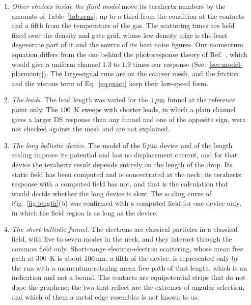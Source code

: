 \begin{enumerate}
under gates of $5$ and $10\nm$ at $0.3\THz$, which is where the largest
efficiencies of the grid are (Table~\ref{tab:ladders}). No large-signal
calculation here contains the viscoelastic term, and the low-density
points of the grid were not examined without it.
\item \emph{Other choices inside the fluid model} move its terahertz
numbers by the amounts of Table~\ref{tab:sens}: up to a third from the
condition at the contacts and a fifth from the temperature of the gas.
The scattering times are held fixed over the density and gate grid,
whose low-density edge is the least degenerate part of it and the source
of its best noise figures. Our momentum equation differs from the one
behind the photoresponse theory of Ref.~\cite{tomadin2013theory}, which
would give a uniform channel $1.3$ to $1.9$ times our response
(Sec.~\ref{sec:model-plasmonic}). The large-signal runs are on the
coarser mesh, and the friction and the viscous term of
Eq.~\eqref{eq:exact} keep their low-speed form.
\item \emph{The leads.} The lead length was varied for the $1\,\mu\mathrm{m}$ funnel
at the reference point only. The $100$~K sweeps with shorter leads, in
which a plain channel gives a larger DS response than any funnel and one
of the opposite sign, were not checked against the mesh and are not
explained.
\item \emph{The long ballistic device.} The model of the $6\,\mu\mathrm{m}$ device
and of the length scaling imposes its potential and has no displacement
current, and for that device the terahertz result depends entirely on
the length of the drop. Its static field has been computed and is
concentrated at the neck; its terahertz response with a computed field
has not, and that is the calculation that would decide whether the long
device is slow. The scaling curve of Fig.~\ref{fig:length}(b) was
confirmed with a computed field for one device only, in which the field
region is as long as the device.
\item \emph{The short ballistic funnel.} The electrons are classical
particles in a classical field, with five to seven modes in the neck,
and they interact through the common field only. Short-range
electron-electron scattering, whose mean free path at $300$~K is about
$100\,\mathrm{nm}$, a fifth of the device, is represented only by the run with a
momentum-relaxing mean free path of that length, which is an indication
and not a bound. The contacts are equipotential strips that do not dope
the graphene; the two that reflect are the extremes of angular
selection, and which of them a metal edge resembles is not known to us.

\end{enumerate}
